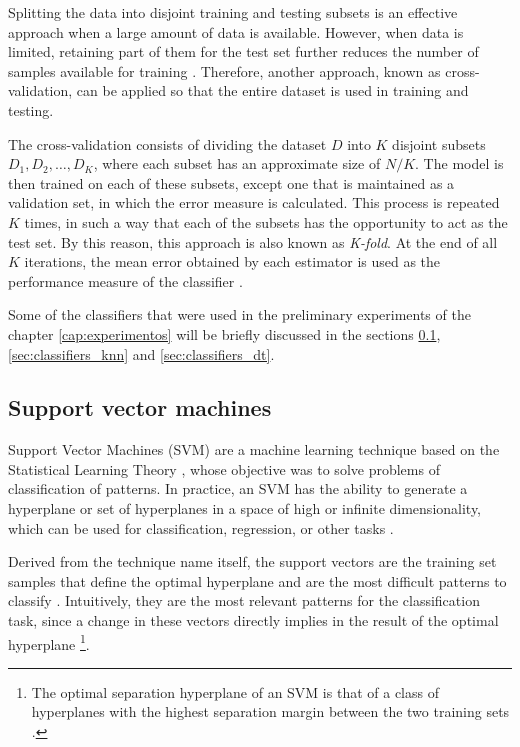 Splitting the data into disjoint training and testing subsets is an effective approach when a large amount of data is available. However, when data is limited, retaining part of them for the test set further reduces the number of samples available for training \citep{mitchell:97}. Therefore, another approach, known as cross-validation, can be applied so that the entire dataset is used in training and testing.

The cross-validation consists of dividing the dataset $D$ into $K$ disjoint subsets $D_1, D_2, \ldots, D_K$, where each subset has an approximate size of $N / K$. The model is then trained on each of these subsets, except one that is maintained as a validation set, in which the error measure is calculated. This process is repeated $K$ times, in such a way that each of the subsets has the opportunity to act as the test set. By this reason, this approach is also known as \emph{K-fold}. At the end of all $K$ iterations, the mean error obtained by each estimator is used as the performance measure of the classifier \citep{mostafa:12}.

Some of the classifiers that were used in the preliminary experiments of the chapter \ref{cap:experimentos} will be briefly discussed in the sections \ref{sec:classifiers_svm}, \ref{sec:classifiers_knn} and \ref{sec:classifiers_dt}.



\subsection{Support vector machines}
\label{sec:classifiers_svm}
Support Vector Machines (SVM) are a machine learning technique based on the Statistical Learning Theory \citep{vapnik:13}, whose objective was to solve problems of classification of patterns. In practice, an SVM has the ability to generate a hyperplane or set of hyperplanes in a space of high or infinite dimensionality, which can be used for classification, regression, or other tasks \citep{duda:12}.

Derived from the technique name itself, the support vectors are the training set samples that define the optimal hyperplane and are the most difficult patterns to classify \citep{duda:12}. Intuitively, they are the most relevant patterns for the classification task, since a change in these vectors directly implies in the result of the optimal hyperplane \footnote{The optimal separation hyperplane of an SVM is that of a class of hyperplanes with the highest separation margin between the two training sets \citep{cortes:95}.}.

